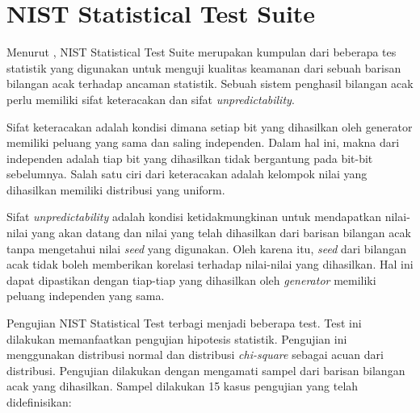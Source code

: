 \section{NIST Statistical Test Suite}
\label{sec:nist.statistical.test}

Menurut \textcite{rukhin2010}, NIST Statistical Test Suite merupakan kumpulan dari beberapa tes statistik yang digunakan untuk menguji kualitas keamanan dari sebuah barisan bilangan acak terhadap ancaman statistik. Sebuah sistem penghasil bilangan acak perlu memiliki sifat keteracakan dan sifat \emph{unpredictability}. 

Sifat keteracakan adalah kondisi dimana setiap bit yang dihasilkan oleh generator memiliki peluang yang sama dan saling independen. Dalam hal ini, makna dari independen adalah tiap bit yang dihasilkan tidak bergantung pada bit-bit sebelumnya. Salah satu ciri dari keteracakan adalah kelompok nilai yang dihasilkan memiliki distribusi yang uniform.

Sifat \emph{unpredictability} adalah kondisi ketidakmungkinan untuk mendapatkan nilai-nilai yang akan datang dan nilai yang telah dihasilkan dari barisan bilangan acak tanpa mengetahui nilai \emph{seed} yang digunakan. Oleh karena itu, \emph{seed} dari bilangan acak tidak boleh memberikan korelasi terhadap nilai-nilai yang dihasilkan. Hal ini dapat dipastikan dengan tiap-tiap yang dihasilkan oleh \emph{generator} memiliki peluang independen yang sama.

Pengujian NIST Statistical Test terbagi menjadi beberapa test. Test ini dilakukan memanfaatkan pengujian hipotesis statistik. Pengujian ini menggunakan distribusi normal dan distribusi \emph{chi-square} sebagai acuan dari distribusi. Pengujian dilakukan dengan mengamati sampel dari barisan bilangan acak yang dihasilkan. Sampel dilakukan 15 kasus pengujian yang telah didefinisikan:

